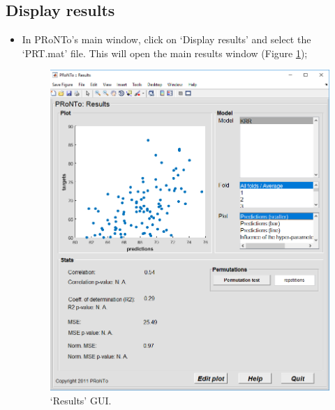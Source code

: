 \begin{itemize}
	
\end{itemize}



\subsection{Display results}
\label{display_results_confounds}

\begin{itemize}
	
	\item In PRoNTo's main window, click on `Display results' and select the `PRT.mat' file. This will open the main results window (Figure \ref{fig:results_reg});
	
\begin{figure}[h!]
	\centering
		\includegraphics[scale=0.65]{images/Tutorial/confounds/results_reg.png}
	\caption{`Results' GUI.}
	\label{fig:results_reg}
\end{figure}

	

\end{itemize}
